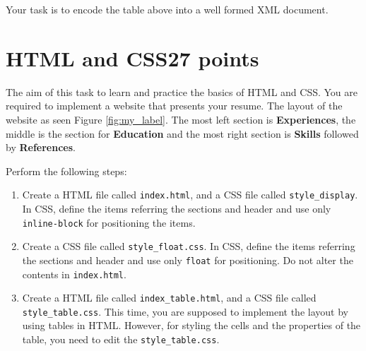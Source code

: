 \documentclass{resources/WeSTassignment}
\begin{document}
\begin{table}[h]
\end{table}

Your task is to encode the table above into a well formed XML document. 


\section{HTML and CSS\hfill{27 points}\label{html}}
The aim of this task to learn and practice the basics of HTML and CSS. You are required to implement a website that presents your resume. The layout of the website as seen Figure \ref{fig:my_label}. The most left section is \textbf{Experiences}, the middle is the section for \textbf{Education} and the most right section is \textbf{Skills} followed by \textbf{References}.

Perform the following steps:
\begin{enumerate}
    \item Create a HTML file called \texttt{index.html}, and a CSS file called \texttt{style\_display}. In CSS, define the items referring the sections and header and use only \texttt{inline-block} for positioning the items.
    \item Create a CSS file called \texttt{style\_float.css}. In CSS, define the items referring the sections and header and use only \texttt{float} for positioning. Do not alter the contents in \texttt{index.html}.
    \item Create a HTML file called \texttt{index\_table.html}, and a CSS file called \texttt{style\_table.css}. This time, you are supposed to implement the layout by using tables in HTML. However, for styling the cells and the properties of the table, you need to edit the \texttt{style\_table.css}.
\end{enumerate}
\end{document}
